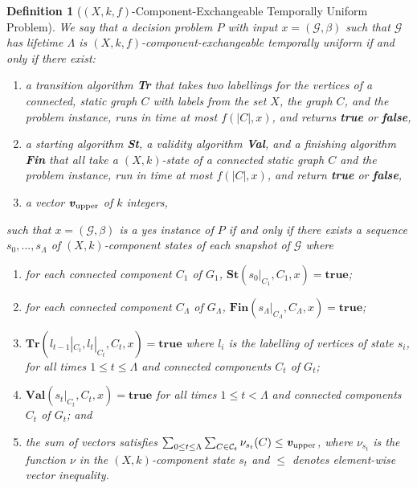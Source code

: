 \documentclass[a4paper,UKenglish,cleveref, autoref, thm-restate]{lipics-v2021} %
\newcounter{ctheorem}
\newtheorem{defn}[ctheorem]{Definition}
\begin{document}
\begin{defn}[$(X,k,f)$-Component-Exchangeable Temporally Uniform Problem]\label{def:component-temp-unif}
    We say that a decision problem $P$ with input $x=(\mathcal{G},\beta)$ such that $\mathcal{G}$ has lifetime $\Lambda$ is $(X,k,f)$-component-exchangeable temporally uniform if and only if there exist:
    \begin{enumerate}
        \item a transition algorithm \textbf{Tr} that takes two labellings for the vertices of a connected, static graph $C$ with labels from the set $X$, the graph $C$, and the problem instance, runs in time at most $f(|C|,x)$, and returns \textbf{true} or \textbf{false},
        \item a starting algorithm \textbf{St}, a validity algorithm \textbf{Val}, and a finishing algorithm \textbf{Fin} that all take a $(X,k)$-state of a connected static graph $C$ and the problem instance, run in time at most $f(|C|,x)$, and return \textbf{true} or \textbf{false},
        \item a vector $\textbf{\emph{v}}_{\text{upper}}$ of $k$ integers,
    \end{enumerate}
    \noindent such that $x=(\mathcal{G}, \beta)$ is a yes instance of $P$ if and only if there exists a sequence $s_0, ..., s_\Lambda$ of $(X,k)$-component states of each snapshot of $\mathcal{G}$ where
    \begin{enumerate}[i]
        \item for each connected component $C_1$ of $G_1$, $\textbf{St}(s_0|_{C_1},C_1,x)=\textbf{true}$;
        \item for each connected component $C_{\Lambda}$ of $G_{\Lambda}$, $\textbf{Fin}(s_{\Lambda}|_{C_{\Lambda}},C_{\Lambda},x)=\textbf{true}$;
        \item $\textbf{Tr}(l_{t-1}|_{C_t}, l_t|_{C_t}, C_t,x)=\textbf{true}$ where $l_i$ is the labelling of vertices of state $s_i$, for all times $1 \leq t \leq \Lambda$ and connected components $C_t$ of $G_t$;
        \item $\textbf{Val}(s_t|_{C_t}, C_t,x)=\textbf{true}$ for all times $1 \leq t < \Lambda$ and connected components $C_t$ of $G_t$; and
        \item the sum of vectors satisfies $\sum_{0\leq t\leq \Lambda} \sum_{C \in\mathcal{C}_t}\nu_{s_t} (C)\leq \textbf{\emph{v}}_{\text{upper}}$, where $\nu_{s_t}$ is the function $\nu$ in the $(X,k)$-component state $s_t$ and $\leq$ denotes element-wise vector inequality.
    \end{enumerate}    
\end{defn}
\end{document}
